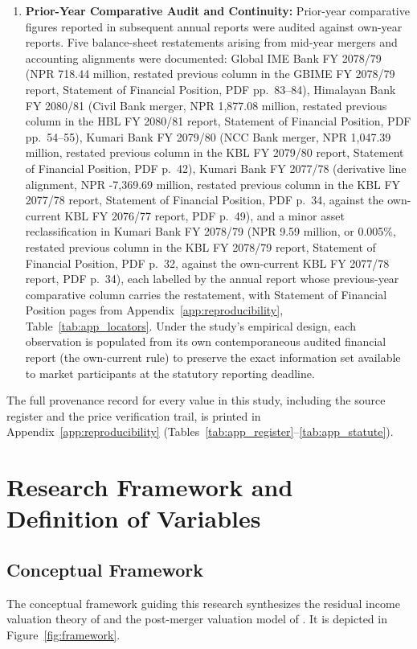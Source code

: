 \begin{enumerate}
    \item \textbf{Prior-Year Comparative Audit and Continuity:} Prior-year comparative figures reported in subsequent annual reports were audited against own-year reports. Five balance-sheet restatements arising from mid-year mergers and accounting alignments were documented: Global IME Bank FY 2078/79 (NPR 718.44 million, restated previous column in the GBIME FY 2078/79 report, Statement of Financial Position, PDF pp.~83--84), Himalayan Bank FY 2080/81 (Civil Bank merger, NPR 1,877.08 million, restated previous column in the HBL FY 2080/81 report, Statement of Financial Position, PDF pp.~54--55), Kumari Bank FY 2079/80 (NCC Bank merger, NPR 1,047.39 million, restated previous column in the KBL FY 2079/80 report, Statement of Financial Position, PDF p.~42), Kumari Bank FY 2077/78 (derivative line alignment, NPR -7,369.69 million, restated previous column in the KBL FY 2077/78 report, Statement of Financial Position, PDF p.~34, against the own-current KBL FY 2076/77 report, PDF p.~49), and a minor asset reclassification in Kumari Bank FY 2078/79 (NPR 9.59 million, or 0.005\%, restated previous column in the KBL FY 2078/79 report, Statement of Financial Position, PDF p.~32, against the own-current KBL FY 2077/78 report, PDF p.~34), each labelled by the annual report whose previous-year comparative column carries the restatement, with Statement of Financial Position pages from Appendix~\ref{app:reproducibility}, Table~\ref{tab:app_locators}. Under the study's empirical design, each observation is populated from its own contemporaneous audited financial report (the own-current rule) to preserve the exact information set available to market participants at the statutory reporting deadline.
\end{enumerate}

The full provenance record for every value in this study, including the source register and the price verification trail, is printed in Appendix~\ref{app:reproducibility} (Tables~\ref{tab:app_register}--\ref{tab:app_statute}).

\section{Research Framework and Definition of Variables}

\subsection{Conceptual Framework}
The conceptual framework guiding this research synthesizes the residual income valuation theory of \citet{ohlson1995} and the post-merger valuation model of \citet{kwon2020}. It is depicted in Figure~\ref{fig:framework}.

